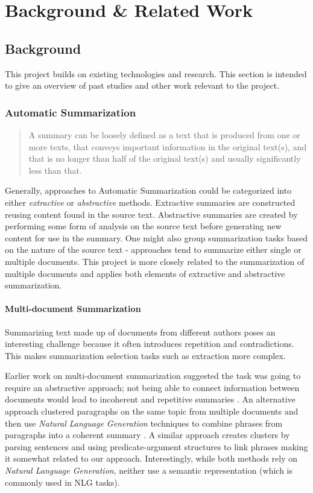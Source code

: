 \chapter{Background \& Related Work\label{chap:background-related}}
  \section{Background}
    This project builds on existing technologies and research. This section is intended to give an overview of past studies and other work relevant to the project.

    \tocless\subsection{Automatic Summarization}
      \blockquote{A summary can be loosely defined as a text that is produced from one or more texts, that conveys important information in the original text(s), and that is no longer than half of the original text(s) and usually significantly less than that.} \cite{radev2002introduction}

      Generally, approaches to Automatic Summarization could be categorized into either \textit{extractive} or \textit{abstractive} methods. Extractive summaries are constructed reusing content found in the source text. Abstractive summaries are created by performing some form of analysis on the source text before generating new content for use in the summary. One might also group summarization tasks based on the nature of the source text - approaches tend to summarize either single or multiple documents. This project is more closely related to the summarization of multiple documents and applies both elements of extractive and abstractive summarization.

      \tocless\subsubsection{Multi-document Summarization}

        Summarizing text made up of documents from different authors poses an interesting challenge because it often introduces repetition and contradictions. This makes summarization selection tasks such as extraction more complex.

        Earlier work on multi-document summarization suggested the task was going to require an abstractive approach; not being able to connect information between documents would lead to incoherent and repetitive summaries \cite{McKeown1999TMS315149315355}. An alternative approach clustered paragraphs on the same topic from multiple documents and then use \textit{Natural Language Generation} techniques to combine phrases from paragraphs into a coherent summary \cite{McKeown1999TMS315149315355}. A similar approach creates clusters by parsing sentences and using predicate-argument structures to link phrases \cite{barzilay1999information} making it somewhat related to our approach. Interestingly, while both methods rely on \textit{Natural Language Generation}, neither use a semantic representation (which is commonly used in NLG tasks).

